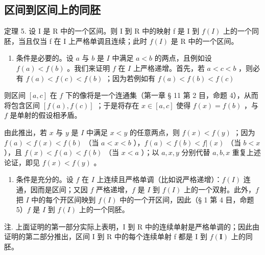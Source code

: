 \subsection{区间到区间上的同胚}

定理 5. 设 I 是 R 中的一个区间。则 I 到 R 中的映射 f 是 I 到 \(f(I)\) 上的一个同胚，当且仅当 f 在 I 上严格单调且连续；此时 \(f(I)\) 是 R 中的一个区间。

\begin{enumerate}
\def\labelenumi{\arabic{enumi})}
\tightlist
\item
  条件是必要的。设 \(a\) 与 \(b\) 是 \(I\) 中满足 \(a < b\) 的两点，且例如设 \(f(a) < f(b)\) 。我们来证明 \(f\) 在 \(I\) 上严格递增。首先，若 \(a < c < b\) ，则必有 \(f(a) < f(c) < f(b)\) ；因为若例如有 \(f(a) < f(b) < f(c)\)
\end{enumerate}

则区间 \([a, c]\) 在 \(f\) 下的像将是一个连通集（第一章 § 11 第 2 目，命题 4），从而将包含区间 \([f(a), f(c)]\) ；于是将存在 \(x \in [a, c]\) 使得 \(f(x) = f(b)\) ，与 \(f\) 是单射的假设相矛盾。

由此推出，若 \(x\) 与 \(y\) 是 \(I\) 中满足 \(x < y\) 的任意两点，则 \(f(x) < f(y)\) ；因为 \(f(a) < f(x) < f(b)\) （当 \(a < x < b\) ），\(f(a) < f(b) < f|(x)\) （当 \(b < x\) ），且 \(f(x) < f(a) < f(b)\) （当 \(x < a\) ）；以 \(a, x, y\) 分别代替 \(a, b, x\) 重复上述论证，即见 \(f(x) < f(y)\) 。

\begin{enumerate}
\def\labelenumi{\arabic{enumi})}
\setcounter{enumi}{1}
\tightlist
\item
  条件是充分的。设 \(f\) 在 \(I\) 上连续且严格单调（比如说严格递增）：\(f(I)\) 连通，因而是区间；又因 \(f\) 严格递增，\(f\) 是 \(I\) 到 \(f(I)\) 上的一个双射。此外，\(f\) 把 \(I\) 中的每个开区间映到 \(f(I)\) 中的一个开区间，因此（§ 1 第 4 目，命题 5）\(f\) 是 \(I\) 到 \(f(I)\) 上的一个同胚。
\end{enumerate}

注. 上面证明的第一部分实际上表明，I 到 R 中的连续单射是严格单调的；因此由证明的第二部分推出，区间 I 到 R 中的每个连续单射 f 都是 I 到 \(f(\mathbf{I})\) 上的同胚。

